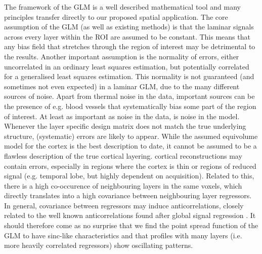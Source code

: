 The framework of the GLM is a well described mathematical tool and many principles transfer directly to our proposed spatial application. The core assumption of the GLM (as well as  existing methods) is that the laminar signals across every layer within the ROI are assumed to be constant. This means that any bias field that stretches through the region of interest may be detrimental to the results. Another important assumption is the normality of errors, either uncorrelated in an ordinary least squares estimation, but potentially correlated for a generalised least squares estimation. This normality is not guaranteed (and sometimes not even expected) in a laminar GLM, due to the many different sources of noise. Apart from thermal noise in the data, important sources can be the presence of e.g. blood vessels that systematically bias some part of the region of interest.
%
At least as important as noise in the data, is noise in the model. Whenever the layer specific design matrix does not match the true underlying structure, (systematic) errors are likely to appear. While the assumed equivolume model for the cortex is the best description to date, it cannot be assumed to be a flawless description of the true cortical layering.   cortical reconstructions  may contain errors, especially in regions where the cortex is thin  or regions of reduced signal (e.g. temporal lobe, but highly dependent on acquisition). Related to this, there is a high co-occurence of neighbouring layers in the same voxels, which directly translates into a high covariance between neighbouring layer regressors. In general, covariance between regressors may induce anticorrelations, closely related to the well known anticorrelations found after global signal regression \cite{Uddin2009}. It should therefore come as no surprise that we find the point spread function of the GLM to have sinc-like characteristics and that profiles with many layers (i.e. more heavily correlated regressors) show oscillating patterns.

